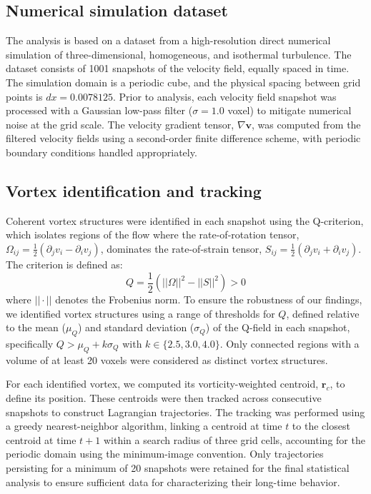 \documentclass[]{article}
\begin{document}
\subsection{Numerical simulation dataset}
The analysis is based on a dataset from a high-resolution direct numerical simulation of three-dimensional, homogeneous, and isothermal turbulence. The dataset consists of 1001 snapshots of the velocity field, equally spaced in time. The simulation domain is a periodic cube, and the physical spacing between grid points is $dx=0.0078125$. Prior to analysis, each velocity field snapshot was processed with a Gaussian low-pass filter ($\sigma=1.0$ voxel) to mitigate numerical noise at the grid scale. The velocity gradient tensor, $\nabla \mathbf{v}$, was computed from the filtered velocity fields using a second-order finite difference scheme, with periodic boundary conditions handled appropriately.

\subsection{Vortex identification and tracking}
Coherent vortex structures were identified in each snapshot using the Q-criterion, which isolates regions of the flow where the rate-of-rotation tensor, $\Omega_{ij} = \frac{1}{2}(\partial_j v_i - \partial_i v_j)$, dominates the rate-of-strain tensor, $S_{ij} = \frac{1}{2}(\partial_j v_i + \partial_i v_j)$. The criterion is defined as:
\begin{equation}
    Q = \frac{1}{2} \left( ||\Omega||^2 - ||S||^2 \right) > 0
\end{equation}
where $||\cdot||$ denotes the Frobenius norm. To ensure the robustness of our findings, we identified vortex structures using a range of thresholds for $Q$, defined relative to the mean ($\mu_Q$) and standard deviation ($\sigma_Q$) of the Q-field in each snapshot, specifically $Q > \mu_Q + k\sigma_Q$ with $k \in \{2.5, 3.0, 4.0\}$. Only connected regions with a volume of at least 20 voxels were considered as distinct vortex structures.

For each identified vortex, we computed its vorticity-weighted centroid, $\mathbf{r}_c$, to define its position. These centroids were then tracked across consecutive snapshots to construct Lagrangian trajectories. The tracking was performed using a greedy nearest-neighbor algorithm, linking a centroid at time $t$ to the closest centroid at time $t+1$ within a search radius of three grid cells, accounting for the periodic domain using the minimum-image convention. Only trajectories persisting for a minimum of 20 snapshots were retained for the final statistical analysis to ensure sufficient data for characterizing their long-time behavior.
\end{document}
